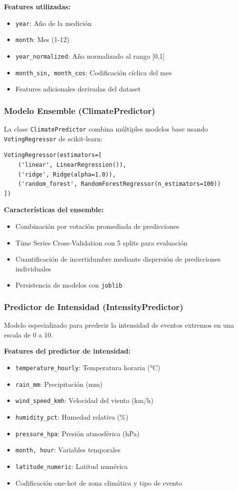 \documentclass[12pt,a4paper]{scrartcl}
\begin{document}
\textbf{Features utilizadas:}
\begin{itemize}
    \item \texttt{year}: Año de la medición
    \item \texttt{month}: Mes (1-12)
    \item \texttt{year\_normalized}: Año normalizado al rango [0,1]
    \item \texttt{month\_sin, month\_cos}: Codificación cíclica del mes
    \item Features adicionales derivadas del dataset
\end{itemize}

\subsubsection{Modelo Ensemble (ClimatePredictor)}

La clase \texttt{ClimatePredictor} combina múltiples modelos base usando \texttt{VotingRegressor} de scikit-learn:

\begin{verbatim}
VotingRegressor(estimators=[
    ('linear', LinearRegression()),
    ('ridge', Ridge(alpha=1.0)),
    ('random_forest', RandomForestRegressor(n_estimators=100))
])
\end{verbatim}

\textbf{Características del ensemble:}
\begin{itemize}
    \item Combinación por votación promediada de predicciones
    \item Time Series Cross-Validation con 5 splits para evaluación
    \item Cuantificación de incertidumbre mediante dispersión de predicciones individuales
    \item Persistencia de modelos con \texttt{joblib}
\end{itemize}

\subsubsection{Predictor de Intensidad (IntensityPredictor)}

Modelo especializado para predecir la intensidad de eventos extremos en una escala de 0 a 10.

\textbf{Features del predictor de intensidad:}
\begin{itemize}
    \item \texttt{temperature\_hourly}: Temperatura horaria (°C)
    \item \texttt{rain\_mm}: Precipitación (mm)
    \item \texttt{wind\_speed\_kmh}: Velocidad del viento (km/h)
    \item \texttt{humidity\_pct}: Humedad relativa (\%)
    \item \texttt{pressure\_hpa}: Presión atmosférica (hPa)
    \item \texttt{month, hour}: Variables temporales
    \item \texttt{latitude\_numeric}: Latitud numérica
    \item Codificación one-hot de zona climática y tipo de evento
\end{itemize}
\end{document}
